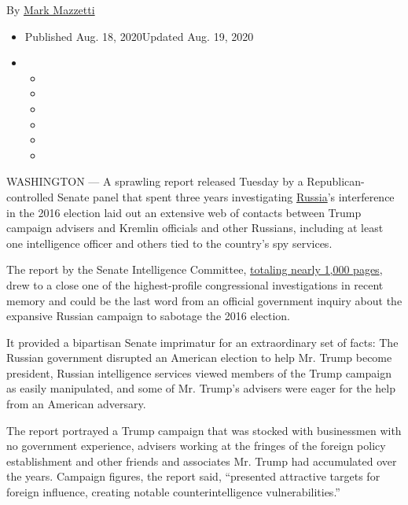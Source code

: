 By \href{https://www.nytimes3xbfgragh.onion/by/mark-mazzetti}{Mark
Mazzetti}

\begin{itemize}
\item
  Published Aug. 18, 2020Updated Aug. 19, 2020
\item
  \begin{itemize}
  \item
  \item
  \item
  \item
  \item
  \item
  \end{itemize}
\end{itemize}

WASHINGTON --- A sprawling report released Tuesday by a
Republican-controlled Senate panel that spent three years investigating
\href{https://www.nytimes3xbfgragh.onion/2020/09/01/us/politics/us-russia-military-tensions.html}{Russia}'s
interference in the 2016 election laid out an extensive web of contacts
between Trump campaign advisers and Kremlin officials and other
Russians, including at least one intelligence officer and others tied to
the country's spy services.

The report by the Senate Intelligence Committee,
\href{https://int.graylady3jvrrxbe.onion/data/documenttools/senate-intelligence-committee-russian-interference/8cf58e574d235164/full.pdf}{totaling
nearly 1,000 pages}, drew to a close one of the highest-profile
congressional investigations in recent memory and could be the last word
from an official government inquiry about the expansive Russian campaign
to sabotage the 2016 election.

It provided a bipartisan Senate imprimatur for an extraordinary set of
facts: The Russian government disrupted an American election to help Mr.
Trump become president, Russian intelligence services viewed members of
the Trump campaign as easily manipulated, and some of Mr. Trump's
advisers were eager for the help from an American adversary.

The report portrayed a Trump campaign that was stocked with businessmen
with no government experience, advisers working at the fringes of the
foreign policy establishment and other friends and associates Mr. Trump
had accumulated over the years. Campaign figures, the report said,
``presented attractive targets for foreign influence, creating notable
counterintelligence vulnerabilities.''

